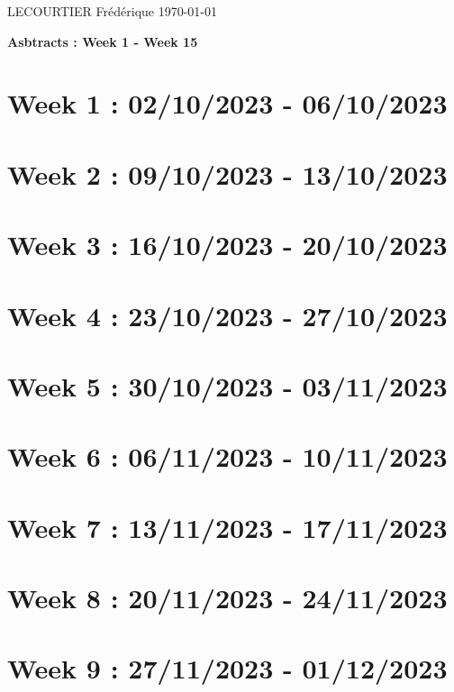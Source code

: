 \documentclass[french]{article}
\begin{document}
	LECOURTIER Frédérique \hfill \today
	\begin{center}
		\Large\textbf{{Asbtracts : Week 1 - Week 15}}
	\end{center}

	\section{Week 1 : 02/10/2023 - 06/10/2023}
	

	\section{Week 2 : 09/10/2023 - 13/10/2023}
	

	\section{Week 3 : 16/10/2023 - 20/10/2023}
	

	\section{Week 4 : 23/10/2023 - 27/10/2023}
	

	\section{Week 5 : 30/10/2023 - 03/11/2023}
	

	\section{Week 6 : 06/11/2023 - 10/11/2023}
	

	\section{Week 7 : 13/11/2023 - 17/11/2023}
	

	\section{Week 8 : 20/11/2023 - 24/11/2023}
	

	\section{Week 9 : 27/11/2023 - 01/12/2023}
	
\end{document}
